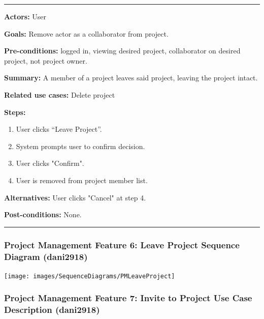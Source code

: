 \documentclass[twoside,letterpaper]{article}
\begin{document}
\vspace{2pt}
\hrule
\vspace{8pt}
\noindent \textbf{Actors:} User \newline

\noindent \textbf{Goals:} Remove actor as a collaborator from project. \newline

\noindent  \textbf{Pre-conditions:} logged in, viewing desired project, collaborator on desired project, not project owner.  \newline

\noindent \textbf{Summary:} A member of a project leaves said project, leaving the project intact. \newline

\noindent \textbf{Related use cases:} Delete project \newline

\noindent \textbf{Steps:} \begin{enumerate}
  \item User clicks ``Leave Project''.
  \item System prompts user to confirm decision.
  \item User clicks "Confirm".
  \item User is removed from project member list.
 \end{enumerate}
 
\noindent  \textbf{Alternatives:} User clicks "Cancel" at step 4. \newline
 
\noindent  \textbf{Post-conditions:} None. \newline
\vspace{8pt}
\hrule
\vspace{20pt}

\subsubsection[Project Management Feature 6: Leave Project Sequence Diagram (dani2918)]{\rmfamily\bfseries\color{black}
	Project Management Feature 6: Leave Project Sequence Diagram  (dani2918)}
\texttt{[image: images/SequenceDiagrams/PMLeaveProject]}

\newpage




\subsubsection[Project Management Feature 7: Invite to Project Use Case Description (dani2918)]{\rmfamily\bfseries\color{black}
	Project Management Feature 7: Invite to Project Use Case Description  (dani2918)}
\hypertarget{RefHeading22059017292}{}
\bigskip
\end{document}
